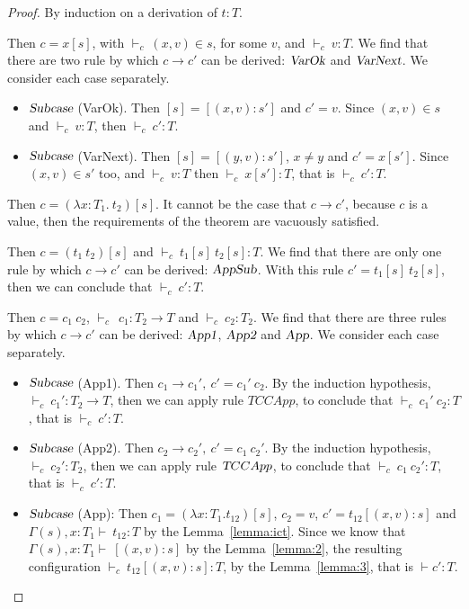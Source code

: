 \documentclass {article}
\newcommand{\tto}{\longrightarrow}
\newcommand{\absD}{\lambda x:T_1. \ t_2}
\newcommand{\conf}[2][s]{(#2)[#1]}
\newcommand{\confx}[1]{#1 [(x,v):s]}
\newcommand{\subxD}{[(x,v):s]}
\newcommand{\subx}{[(x,v):s']}
\newcommand{\suby}{[(y,v):s']}
\newcommand{\envEC}{{\Gamma(s) , x:T_1 \vdash \ }}
\newcommand{\tyC}{{\vdash_c \ }}
\begin{document}
\begin{proof} By induction on a derivation of $t : T$.


\begin{case}[TCVar]
Then $c = x[s]$, with $\tyC (x,v) \in s$, for some $v$, and $\tyC v:T$. We find that there are two rule by which $c \tto c'$ can be derived: $\textsl {VarOk}$ and $\textsl {VarNext}$. We consider each case separately.
\begin{itemize}
\item $\textsl{Subcase}$ (VarOk). Then $[s] = \subx$ and $c' = v$. Since $(x,v) \in s$ and $\tyC v:T$, then $\tyC c' : T$.

\item $\textsl{Subcase}$ (VarNext). Then $[s] = \suby$, $x \neq y$ and $c' = x[s']$. Since $(x,v) \in s'$ too, and $\tyC v:T$ then $\tyC x[s']:T $, that is $\tyC c' : T$. 
\end{itemize}
\end{case}

\begin{case} [TAbs]
Then $c = \conf{\absD}$. It cannot be the case that $c \tto c'$, because $c$ is a value, then the requirements of the theorem are vacuously satisfied. 
\end{case}

\begin{case}[TCApp]
Then $c = \conf{t_1 \ t_2}$ and $\tyC t_1[s] \ t_2[s]: T$. We find that there are only one rule by which $c \tto c'$ can be derived: $\textsl {AppSub}$. With this rule $c' = t_1[s] \ t_2[s]$, then we can conclude that $\tyC c' : T$. 
\end{case}

\begin{case} [TCCApp]
Then $c = c_1 \ c_2$, $\tyC \ c_1 : T_2 \to T$ and $\tyC c_2 : T_2$. We find that there are three rules by which $c \tto c'$ can be derived: $\textsl {App1}$, $\textsl {App2}$ and $\textsl {App}$. We consider each case separately.
\begin{itemize}

\item $\textsl{Subcase}$ (App1). Then $c_1 \tto c_1', \ c' = c_1' \ c_2$. By the induction hypothesis, $\tyC c_1' : T_2 \to T$, then we can apply rule $TCCApp$, to conclude that $\tyC c_1' \ c_2: T$ , that is $\tyC c' : T$.

\item $\textsl{Subcase}$ (App2). Then $c_2 \tto c_2', \ c' = c_1 \ c_2'$. By the induction hypothesis, $\tyC c_2' : T_2 $, then we can apply rule $\textsl TCCApp$, to conclude that $\tyC c_1 \ c_2' : T$, that is $\tyC c' : T$.

\item $\textsl{Subcase}$ (App): Then $c_1 = \conf{\lambda x:T_{1}.t_{12}}$, $c_2 = v$, $c' = \confx{t_{12}}$ and $\envEC t_{12}: T$ by the Lemma~\ref{lemma:ict}. Since we know that $\envEC \subxD$ by the Lemma~\ref{lemma:2}, the resulting configuration $\tyC \confx{t_{12}}:T$, by the Lemma~\ref{lemma:3}, that is $\vdash c' : T$.
\end{itemize}
\end{case}
\end{proof}
\end{document}
